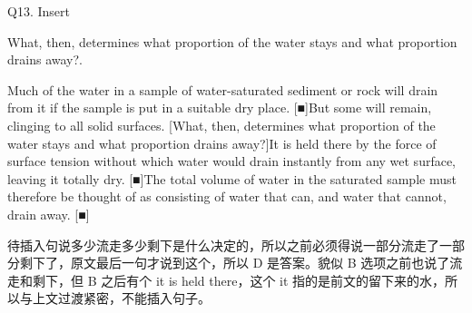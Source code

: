 \begin{blk}
    \begin{qst}
        Q13. Insert
    \end{qst}

    \begin{chc}
        What, then, determines what proportion of the water stays and what proportion drains away?.
    \end{chc}

    \begin{psgq}
        Much of the water in a sample of water-saturated sediment or rock will drain from it if the sample is put in a suitable dry place. [■]But some will remain, clinging to all solid surfaces. [What, then, determines what proportion of the water stays and what proportion drains away?]It is held there by the force of surface tension without which water would drain instantly from any wet surface, leaving it totally dry. [■]The total volume of water in the saturated sample must therefore be thought of as consisting of water that can, and water that cannot, drain away. [■]
    \end{psgq}

    \begin{nlz}
        待插入句说多少流走多少剩下是什么决定的，所以之前必须得说一部分流走了一部分剩下了，原文最后一句才说到这个，所以 D 是答案。貌似 B 选项之前也说了流走和剩下，但 B 之后有个 it is held there，这个 it 指的是前文的留下来的水，所以与上文过渡紧密，不能插入句子。
    \end{nlz}
\end{blk}


